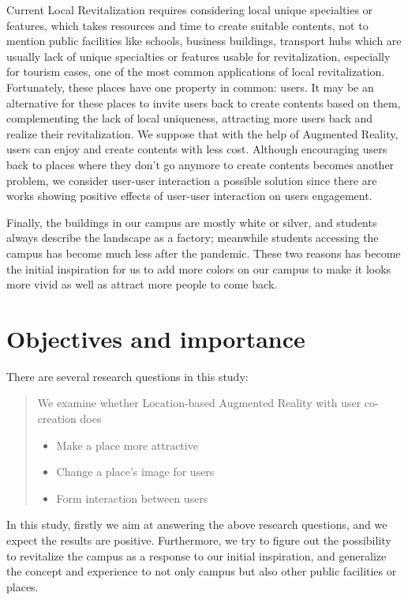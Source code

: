 Current Local Revitalization requires considering local unique specialties or features, which takes resources and time to create suitable contents,
not to mention public facilities like schools, business buildings, transport hubs which are usually lack of unique specialties or features usable for revitalization,
especially for tourism cases, one of the most common applications of local revitalization.
Fortunately, these places have one property in common: users. It may be an alternative for these places to invite users back to create contents based on them,
complementing the lack of local uniqueness, attracting more users back and realize their revitalization.
We suppose that with the help of Augmented Reality, users can enjoy and create contents with less cost.
Although encouraging users back to places where they don't go anymore to create contents becomes another problem,
we consider user-user interaction a possible solution since there are works showing positive effects of user-user interaction on users engagement.


Finally, the buildings in our campus are mostly white or silver, and students always describe the landscape as a factory; meanwhile students accessing the campus has become much less after the pandemic.
These two reasons has become the initial inspiration for us to add more colors on our campus to make it looks more vivid as well as attract more people to come back.

\section{Objectives and importance}


There are several research questions in this study:
\begin{quote}
We examine whether Location-based Augmented Reality with user co-creation does
  \begin{itemize}
    \item Make a place more attractive
    \item Change a place's image for users
    \item Form interaction between users
  \end{itemize}
\end{quote}


In this study, firstly we aim at answering the above research questions, and we expect the results are positive.
Furthermore, we try to figure out the possibility to revitalize the campus as a response to our initial inspiration,
and generalize the concept and experience to not only campus but also other public facilities or places.

